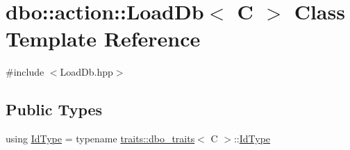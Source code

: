 \hypertarget{classdbo_1_1action_1_1_load_db}{\section{dbo\+:\+:action\+:\+:Load\+Db$<$ C $>$ Class Template Reference}
\label{classdbo_1_1action_1_1_load_db}
}


{\ttfamily \#include $<$Load\+Db.\+hpp$>$}

\subsection*{Public Types}
\begin{DoxyCompactItemize}
\item 
using \hyperlink{classdbo_1_1action_1_1_load_db_ab8096fbb7b377363def6103e9dd451a1}{Id\+Type} = typename \hyperlink{structdbo_1_1traits_1_1dbo__traits}{traits\+::dbo\+\_\+traits}$<$ C $>$\+::\hyperlink{classdbo_1_1action_1_1_load_db_ab8096fbb7b377363def6103e9dd451a1}{Id\+Type}
\end{DoxyCompactItemize}
